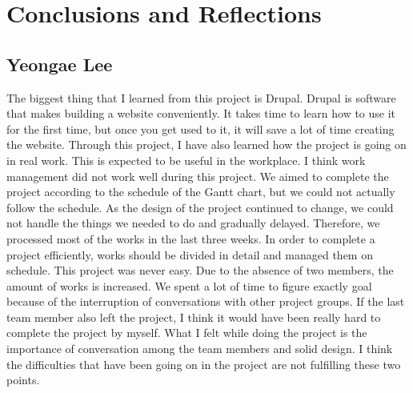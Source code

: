 \documentclass[10pt]{article}
\begin{document}
\section{Conclusions and Reflections}
    \subsection{Yeongae Lee}
        The biggest thing that I learned from this project is Drupal. Drupal is software that makes building a website conveniently. It takes time to learn how to use it for the first time, but once you get used to it, it will save a lot of time creating the website. Through this project, I have also learned how the project is going on in real work. This is expected to be useful in the workplace. I think work management did not work well during this project. We aimed to complete the project according to the schedule of the Gantt chart, but we could not actually follow the schedule. As the design of the project continued to change, we could not handle the things we needed to do and gradually delayed. Therefore, we processed most of the works in the last three weeks. In order to complete a project efficiently, works should be divided in detail and managed them on schedule. This project was never easy. Due to the absence of two members, the amount of works is increased. We spent a lot of time to figure exactly goal because of the interruption of conversations with other project groups. If the last team member also left the project, I think it would have been really hard to complete the project by myself. What I felt while doing the project is the importance of conversation among the team members and solid design. I think the difficulties that have been going on in the project are not fulfilling these two points.
\end{document}

